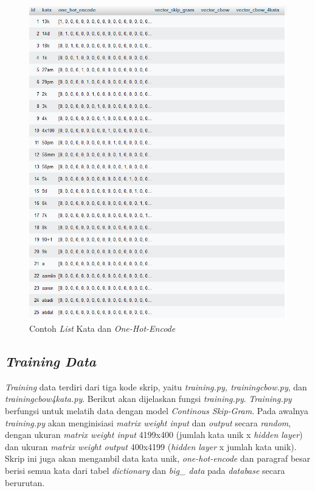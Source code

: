 \documentclass[12pt]{report}
\begin{document}
\begin{figure}[H]
\centering
\includegraphics[scale=0.6]{listkatadanonehotencode}
\caption{Contoh \textit{List} Kata dan \textit{One-Hot-Encode}}
\label{listkatadanonehotencode}
\end{figure}

\subsection{\textit{Training Data}}
\textit{Training} data terdiri dari tiga kode skrip, yaitu \textit{training.py, trainingcbow.py}, dan \textit{trainingcbow4kata.py}. Berikut akan dijelaskan fungsi \textit{training.py}. \textit{Training.py} berfungsi untuk melatih data dengan model \textit{Continous Skip-Gram}. Pada awalnya \textit{training.py} akan menginisiasi \textit{matrix weight input} dan \textit{output} secara \textit{random}, dengan ukuran \textit{matrix weight input} 4199x400 (jumlah kata unik x \textit{hidden layer}) dan ukuran \textit{matrix weight output} 400x4199 (\textit{hidden layer} x jumlah kata unik). Skrip ini juga akan mengambil data kata unik, \textit{one-hot-encode} dan paragraf besar berisi semua kata dari tabel \textit{dictionary} dan \textit{big\_ data} pada \textit{database} secara berurutan.
\end{document}
